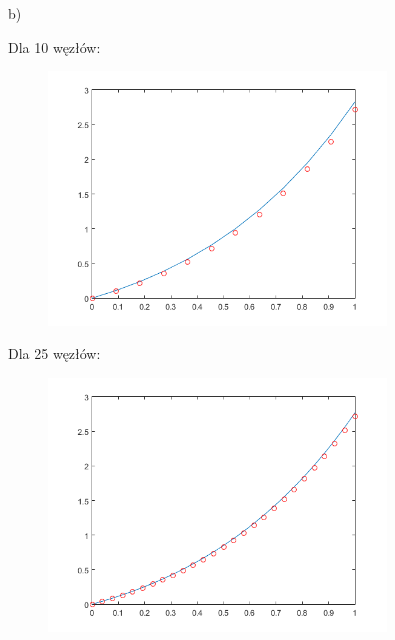 \newpage

b)\\
\begin{samepage}
	Dla 10 węzłów:
	
	
	
	\FloatBarrier
	\begin{figure}[!ht]
		\begin{center}
			\includegraphics[width=0.8\textwidth]{Lab4/charts/zad4/2/10.png}
		\end{center}
	\end{figure}
	\FloatBarrier
\end{samepage}

\begin{samepage}
	Dla 25 węzłów:
	\begin{figure}[!ht]
		\begin{center}
			\includegraphics[width=0.8\textwidth]{Lab4/charts/zad4/2/25.png}
		\end{center}
	\end{figure}
	\FloatBarrier
\end{samepage}

